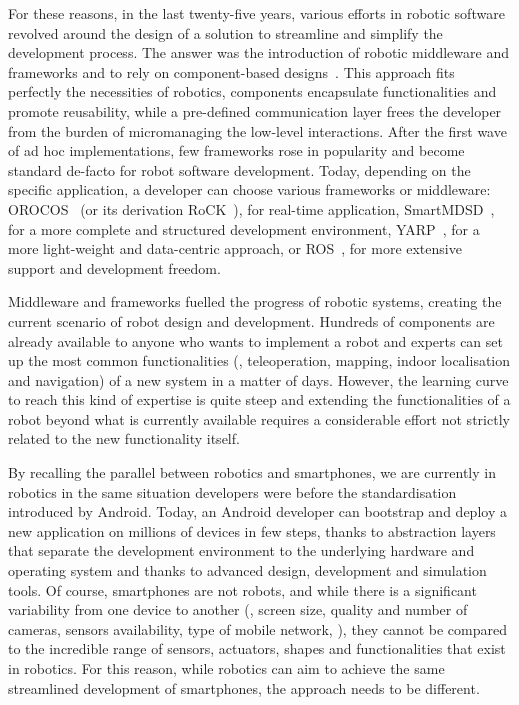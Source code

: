 For these reasons, in the last twenty-five years, various efforts in robotic software revolved around the design of a solution to streamline and simplify the development process. The answer was the introduction of robotic middleware and frameworks and to rely on component-based designs~\cite{brugali2009component, brugali2010component}. This approach fits perfectly the necessities of robotics, components encapsulate functionalities and promote reusability, while a pre-defined communication layer frees the developer from the burden of micromanaging the low-level interactions. After the first wave of ad hoc implementations, few frameworks rose in popularity and become standard de-facto for robot software development. Today, depending on the specific application, a developer can choose various frameworks or middleware: OROCOS~\cite{bruyninckx2002orocos} (or its derivation RoCK~\cite{joyeux2011robot}), for real-time application, SmartMDSD~\cite{dennis2016smartmdsd}, for a more complete and structured development environment, YARP~\cite{metta2006yarp}, for a more light-weight and data-centric approach, or ROS~\cite{quigley2009ros}, for more extensive support and development freedom.

Middleware and frameworks fuelled the progress of robotic systems, creating the current scenario of robot design and development. Hundreds of components are already available to anyone who wants to implement a robot and experts can set up the most common functionalities (\ie, teleoperation, mapping, indoor localisation and navigation) of a new system in a matter of days. However, the learning curve to reach this kind of expertise is quite steep and extending the functionalities of a robot beyond what is currently available requires a considerable effort not strictly related to the new functionality itself.

By recalling the parallel between robotics and smartphones, we are currently in robotics in the same situation developers were before the standardisation introduced by Android. Today, an Android developer can bootstrap and deploy a new application on millions of devices in few steps, thanks to abstraction layers that separate the development environment to the underlying hardware and operating system and thanks to advanced design, development and simulation tools. Of course, smartphones are not robots, and while there is a significant variability from one device to another (\eg, screen size, quality and number of cameras, sensors availability, type of mobile network, \etc), they cannot be compared to the incredible range of sensors, actuators, shapes and functionalities that exist in robotics. For this reason, while robotics can aim to achieve the same streamlined development of smartphones, the approach needs to be different.

